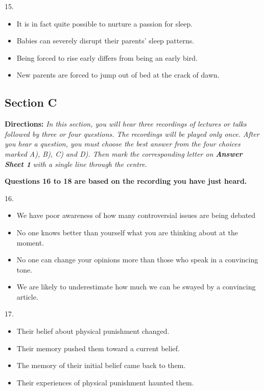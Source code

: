 \documentclass[UTF8,11pt]{ctexart}
\begin{document}
15.


\begin{itemize}[leftmargin=2em,itemsep=.2em,topsep=.4em]\item[A.] It is in fact quite possible to nurture a passion for sleep.
\item[B.] Babies can severely disrupt their parents’ sleep patterns.
\item[C.] Being forced to rise early differs from being an early bird.
\item[D.] New parents are forced to jump out of bed at the crack of dawn.
\end{itemize}

\subsection*{\textbf{Section C}}


\textbf{Directions:}\textit{ In this section, you will hear three recordings of lectures or talks followed by three or four questions. The} \textit{recordings will be played only once. After you hear a question, you must choose the best answer from the four choices} \textit{marked A), B), C) and D). Then mark the corresponding letter on }\textbf{\textit{Answer Sheet 1}}\textit{ with a single line through the centre.}


\textbf{Questions 16 to 18 are based on the recording you have just heard.}


16.


\begin{itemize}[leftmargin=2em,itemsep=.2em,topsep=.4em]\item[A.] We have poor awareness of how many controversial issues are being debated
\item[B.] No one knows better than yourself what you are thinking about at the moment.
\item[C.] No one can change your opinions more than those who speak in a convincing tone.
\item[D.] We are likely to underestimate how much we can be swayed by a convincing article.
\end{itemize}

17.


\begin{itemize}[leftmargin=2em,itemsep=.2em,topsep=.4em]\item[A.] Their belief about physical punishment changed.
\item[B.] Their memory pushed them toward a current belief.
\item[C.] The memory of their initial belief came back to them.
\item[D.] Their experiences of physical punishment haunted them.
\end{itemize}
\end{document}

